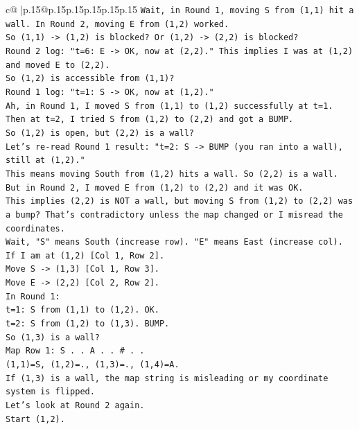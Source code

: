 \documentclass{article}
\begin{document}
{\begin{supertabular}{c@{$\;$}|p{.15\linewidth}@{}p{.15\linewidth}p{.15\linewidth}p{.15\linewidth}p{.15\linewidth}p{.15\linewidth}}
{{{\texttt{Wait, in Round 1, moving S from (1,1) hit a wall. In Round 2, moving E from (1,2) worked.} \\
\texttt{So (1,1) {-}> (1,2) is blocked? Or (1,2) {-}> (2,2) is blocked?} \\
\texttt{Round 2 log: "t=6: E {-}> OK, now at (2,2)." This implies I was at (1,2) and moved E to (2,2).} \\
\texttt{So (1,2) is accessible from (1,1)?} \\
\texttt{Round 1 log: "t=1: S {-}> OK, now at (1,2)."} \\
\texttt{Ah, in Round 1, I moved S from (1,1) to (1,2) successfully at t=1.} \\
\texttt{Then at t=2, I tried S from (1,2) to (2,2) and got a BUMP.} \\
\texttt{So (1,2) is open, but (2,2) is a wall?} \\
\texttt{Let's re{-}read Round 1 result: "t=2: S {-}> BUMP (you ran into a wall), still at (1,2)."} \\
\texttt{This means moving South from (1,2) hits a wall. So (2,2) is a wall.} \\
\texttt{But in Round 2, I moved E from (1,2) to (2,2) and it was OK.} \\
\texttt{This implies (2,2) is NOT a wall, but moving S from (1,2) to (2,2) was a bump? That's contradictory unless the map changed or I misread the coordinates.} \\
\texttt{Wait, "S" means South (increase row). "E" means East (increase col).} \\
\texttt{If I am at (1,2) {[}Col 1, Row 2{]}.} \\
\texttt{Move S {-}> (1,3) {[}Col 1, Row 3{]}.} \\
\texttt{Move E {-}> (2,2) {[}Col 2, Row 2{]}.} \\
\texttt{In Round 1:} \\
\texttt{t=1: S from (1,1) to (1,2). OK.} \\
\texttt{t=2: S from (1,2) to (1,3). BUMP.} \\
\texttt{So (1,3) is a wall?} \\
\texttt{Map Row 1: S . . A . . \# . .} \\
\texttt{(1,1)=S, (1,2)=., (1,3)=., (1,4)=A.} \\
\texttt{If (1,3) is a wall, the map string is misleading or my coordinate system is flipped.} \\
\texttt{Let's look at Round 2 again.} \\
\texttt{Start (1,2).} \\
}}}
\end{supertabular}}
\end{document}
